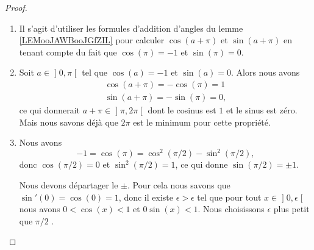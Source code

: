 \begin{proof}
\begin{enumerate}
            Mais d'un autre côté, le nombre \( 2\pi\) est le plus petit \( T\) vérifiant \( \cos(T)=1\), \( \sin(T)=0\). Donc avoir \( \cos(\pi)=1\) n'est pas possible. Nous concluons
            \begin{subequations}
                \begin{numcases}{}
                    \cos(\pi)=-1\\
                    \sin(\pi)=0.
                \end{numcases}
            \end{subequations}
        \item
            Il s'agit d'utiliser les formules d'addition d'angles du lemme \ref{LEMooJAWBooJGfZIL} pour calculer \( \cos(a+\pi)\) et \( \sin(a+\pi)\) en tenant compte du fait que \( \cos(\pi)=-1\) et \( \sin(\pi)=0\).
        \item
        Soit \( a\in\mathopen] 0 , \pi \mathclose[\) tel que \( \cos(a)=-1\) et \( \sin(a)=0\). Alors nous avons
            \begin{subequations}
                \begin{align}
                    \cos(a+\pi)=-\cos(\pi)=1\\
                    \sin(a+\pi)=-\sin(\pi)=0,
                \end{align}
            \end{subequations}
        ce qui donnerait \( a+\pi\in\mathopen] \pi , 2\pi \mathclose[\) dont le cosinus est \( 1\) et le sinus est zéro. Mais nous savons déjà que \( 2\pi\) est le minimum pour cette propriété.
        \item
            Nous avons
            \begin{equation}
                -1=\cos(\pi)=\cos^2(\pi/2)-\sin^2(\pi/2),
            \end{equation}
            donc \( \cos(\pi/2)=0\) et \( \sin^2(\pi/2)=1\), ce qui donne \( \sin(\pi/2)=\pm 1\).

        Nous devons départager le \( \pm\). Pour cela nous savons que \( \sin'(0)=\cos(0)=1\), donc il existe \( \epsilon>\epsilon\) tel que pour tout \( x\in\mathopen] 0 , \epsilon \mathclose[\) nous avons \( 0<\cos(x)<1\) et \( 0\sin(x)<1\). Nous choisissons \( \epsilon\) plus petit que \( \pi/2\) .  
            

\end{enumerate}
\end{proof}
